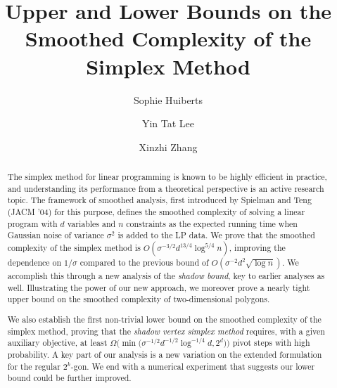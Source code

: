 \documentclass{article}\usepackage[a4paper,margin=20mm]{geometry}
\title{Upper and Lower Bounds on the Smoothed Complexity of the Simplex Method}
\author{Sophie Huiberts \and Yin Tat Lee \and Xinzhi Zhang}\date{}
\begin{document}
\maketitle

\begin{abstract}
The simplex method for linear programming is known to be highly efficient in practice,
and understanding its performance from a theoretical perspective is an active research topic.
The framework of smoothed analysis, first introduced by Spielman and Teng (JACM '04)
for this purpose, defines the smoothed complexity of solving a linear program
with $d$ variables and $n$ constraints as the expected running time when
Gaussian noise of variance $\sigma^2$ is added to the LP data.
We prove that the smoothed complexity of the simplex method is
$O(\sigma^{-3/2} d^{13/4}\log^{5/4} n)$,
improving the dependence on $1/\sigma$ compared to the previous bound of
$O(\sigma^{-2} d^2\sqrt{\log n})$.
We accomplish this through a new analysis of the \emph{shadow bound},
key to earlier analyses as well.
Illustrating the power of our new approach, we moreover prove a
nearly tight upper bound on the smoothed complexity of two-dimensional
polygons.

We also establish the first non-trivial lower bound on the smoothed complexity
of the simplex method, proving that the \emph{shadow vertex simplex method}
requires, with a given auxiliary objective, at least
$\Omega \Big(\min \big(\sigma^{-1/2} d^{-1/2}\log^{-1/4} d,2^d \big) \Big)$
pivot steps with high probability. A key part of our analysis
is a new variation on the extended formulation for the regular $2^k$-gon.
We end with a numerical experiment that suggests our lower bound could
be further improved.
\end{abstract}

\end{document}
